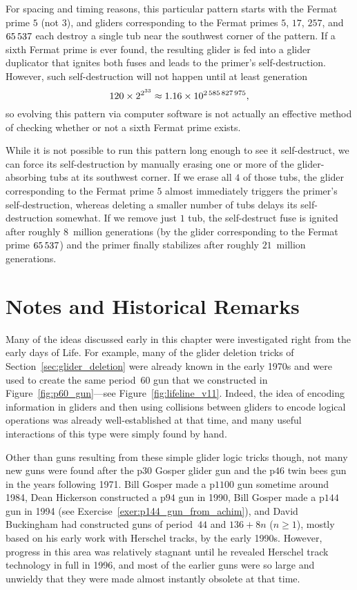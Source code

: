 For spacing and timing reasons, this particular pattern starts with the Fermat prime $5$ (not $3$), and gliders corresponding to the Fermat primes $5$, $17$, $257$, and $65{\,}537$ each destroy a single tub near the southwest corner of the pattern. If a sixth Fermat prime is ever found, the resulting glider is fed into a glider duplicator that ignites both fuses and leads to the primer's self-destruction. However, such self-destruction will not happen until at least generation
\[
	120 \times 2^{2^{33}} \approx 1.16 \times 10^{2{\,}585{\,}827{\,}975},
\]
so evolving this pattern via computer software is not actually an effective method of checking whether or not a sixth Fermat prime exists.

While it is not possible to run this pattern long enough to see it self-destruct, we can force its self-destruction by manually erasing one or more of the glider-absorbing tubs at its southwest corner. If we erase all $4$ of those tubs, the glider corresponding to the Fermat prime $5$ almost immediately triggers the primer's self-destruction, whereas deleting a smaller number of tubs delays its self-destruction somewhat. If we remove just $1$ tub, the self-destruct fuse is ignited after roughly $8$~million generations (by the glider corresponding to the Fermat prime $65{\,}537$) and the primer finally stabilizes after roughly $21$~million generations.


\section{Notes and Historical Remarks}\label{sec:glider_guns_history}

Many of the ideas discussed early in this chapter were investigated right from the early days of Life. For example, many of the glider deletion tricks of Section~\ref{sec:glider_deletion} were already known in the early 1970s and were used to create the same period~$60$ gun that we constructed in Figure~\ref{fig:p60_gun}---see Figure~\ref{fig:lifeline_v11}. Indeed, the idea of encoding information in gliders and then using collisions between gliders to encode logical operations was already well-established at that time, and many useful interactions of this type were simply found by hand.

Other than guns resulting from these simple glider logic tricks though, not many new guns were found after the p$30$ Gosper glider gun and the p$46$ twin bees gun in the years following 1971. Bill Gosper made a p$1100$ gun sometime around 1984, Dean Hickerson constructed a p$94$ gun in 1990, Bill Gosper made a p$144$ gun in 1994 (see Exercise~\ref{exer:p144_gun_from_achim}), and David Buckingham had constructed guns of period~$44$ and $136+8n$ ($n \geq 1$), mostly based on his early work with Herschel tracks, by the early 1990s. However, progress in this area was relatively stagnant until he revealed Herschel track technology in full in 1996, and most of the earlier guns were so large and unwieldy that they were made almost instantly obsolete at that time.

